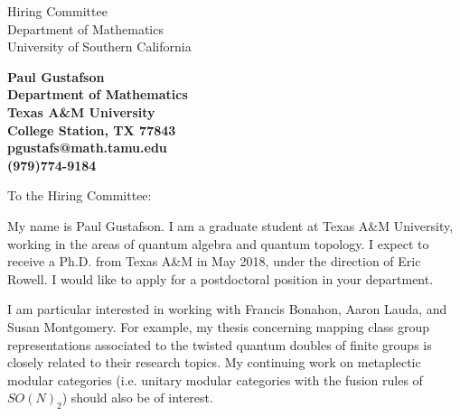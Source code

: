 \documentclass[11pt]{letter} %
\begin{document}

\begin{letter}{Hiring Committee \\
Department of Mathematics \\
University of Southern California}


\begin{center}
\large\bf Paul Gustafson \\ %
Department of Mathematics \\ Texas A\&M University \\ College Station, TX 77843 \\ pgustafs@math.tamu.edu \\ (979)774-9184 %
\end{center} 
\vfill



\opening{To the Hiring Committee:}

My name is Paul Gustafson. I am a graduate student at Texas A\&M University, working in the areas of quantum algebra and quantum topology. I expect to receive a Ph.D. from Texas A\&M in May 2018, under the direction of Eric Rowell. I would like to apply for a postdoctoral position in your department.

I am particular interested in working with Francis Bonahon, Aaron Lauda, and Susan Montgomery.  For example, my thesis concerning mapping class group representations associated to the twisted quantum doubles of finite groups is closely related to their research topics. My continuing work on metaplectic modular categories (i.e. unitary modular categories with the fusion rules of $SO(N)_2$) should also be of interest.


\end{letter}
\end{document}
